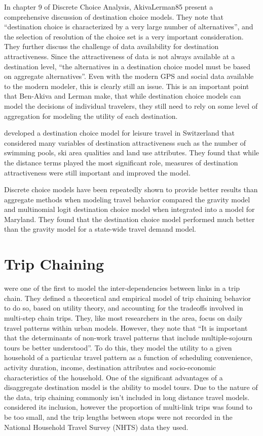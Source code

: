 In chapter 9 of Discrete Choice Analysis, {AkivaLerman85} present a comprehensive discussion of destination choice models. They note that \enquote{destination choice is characterized by a very large number of alternatives}, and the selection of resolution of the choice set is a very important consideration. They further discuss the challenge of data availability for destination attractiveness. Since the attractiveness of data is not always available at a destination level, \enquote{the alternatives in a destination choice model must be based on aggregate alternatives}. Even with the modern GPS and social data available to the modern modeler, this is clearly still an issue. This is an important point that Ben-Akiva and Lerman make, that while destination choice models can model the decisions of individual travelers, they still need to rely on some level of aggregation for modeling the utility of each destination.

\textcite{simma2001destination} developed a destination choice model for leisure travel in Switzerland that considered many variables of destination attractiveness such as the number of swimming pools, ski area qualities and land use attributes. They found that while the distance terms played the most significant role, measures of destination attractiveness were still important and improved the model. 

Discrete choice models have been repeatedly shown to provide better results than aggregate methods when modeling travel behavior \parencite*{Stephanedes84, Mishra13} compared the gravity model and multinomial logit destination choice model when integrated into a model for Maryland. They found that the destination choice model performed much better than the gravity model for a state-wide travel demand model. 

\section{Trip Chaining}
\textcite{AdlerAkiva79} were one of the first to model the inter-dependencies between links in a trip chain. They defined a theoretical and empirical model of trip chaining behavior to do so, based on utility theory, and accounting for the tradeoffs involved in multi-step chain trips. They, like most researchers in the area, focus on daily travel patterns within urban models. However, they note that \enquote{It is important that the determinants of non-work travel patterns that include multiple-sojourn tours be better understood}. To do this, they model the utility to a given household of a particular travel pattern as a function of scheduling convenience, activity duration, income, destination attributes and socio-economic characteristics of the household.
One of the significant advantages of a disaggregate destination model is the ability to model tours. Due to the nature of the data, trip chaining commonly isn't included in long distance travel models. \textcite{Moeckel15} considered its inclusion, however the proportion of multi-link trips was found to be too small, and the trip lengths between stops were not recorded in the National Household Travel Survey (NHTS) data they used. 

